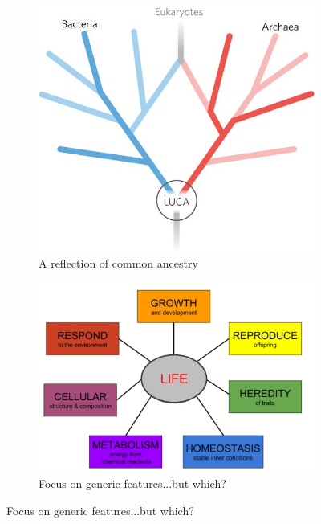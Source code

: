\documentclass[]{article}
\begin{document}
\begin{figure}[H]
	\caption{\acrfull{gls:LAWKI}}\label{fig:LUCA_figs} 
	
	\begin{subfigure}[b]{0.45\textwidth}
		\centering
		\caption{A reflection of common ancestry}\label{fig:LUCA_common} 
		\includegraphics[width=\textwidth]{LUCA_common}
	\end{subfigure}
	\begin{subfigure}[b]{0.45\textwidth}
		\centering
		\caption{Focus on generic features...but which?}\label{fig:lawki-focus} 
		\includegraphics[width=\textwidth]{lawki-focus}
	\end{subfigure}
\end{figure}
\end{document}
